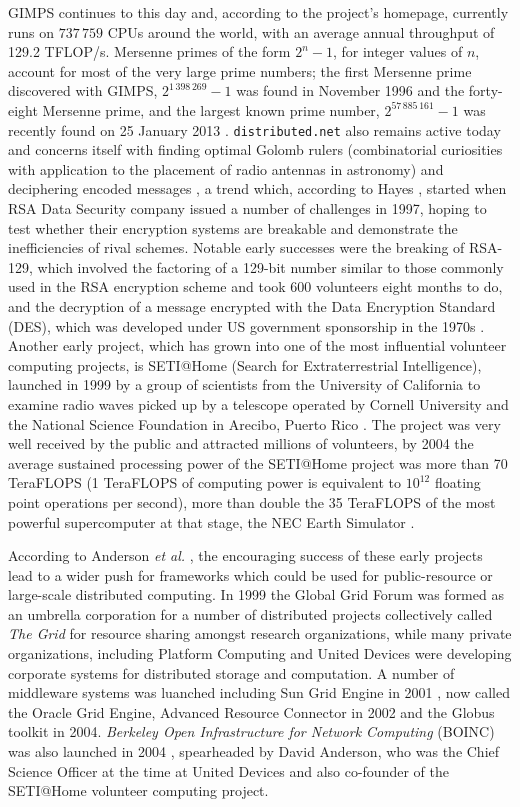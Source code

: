 GIMPS continues to this day and, according to the project's homepage, currently runs on $737\,759$ CPUs around the world, with an average annual throughput of 129.2 TFLOP/s. Mersenne primes of the form $2^n-1$, for integer  values of $n$, account for most of the very large prime numbers; the first Mersenne prime discovered with GIMPS, $2^{1\,398\,269}-1$ was found in November 1996 \cite{hayes} and the  forty-eight Mersenne prime, and the largest known prime number, $2^{57\,885\,161} -1$ was recently found on 25 January 2013 \cite{gimps}. \texttt{distributed.net} also remains active today and concerns itself with finding optimal Golomb rulers (combinatorial curiosities with application to the placement of radio antennas in astronomy) and deciphering encoded messages \cite{distnet}, a trend which, according to Hayes \cite{hayes}, started when RSA Data Security company issued a number of challenges in 1997, hoping to test whether their encryption systems are breakable and demonstrate the inefficiencies of rival schemes. Notable early successes were the breaking of RSA-129, which involved the factoring of a 129-bit number similar to those commonly used in the RSA encryption scheme and  took 600 volunteers eight months to do, and the decryption of a message encrypted with the Data Encryption Standard (DES), which was developed under US government sponsorship in the 1970s \cite{distnet}. 
Another early project, which has grown into one of the most influential volunteer computing projects, is   SETI@Home (Search for Extraterrestrial Intelligence), launched  in 1999 by a group of scientists from the University of California to examine radio waves picked up by a telescope operated by Cornell University and the National Science Foundation in Arecibo, Puerto Rico \cite{anderson:seti2002}. The project was very well received by the public and attracted millions of volunteers, by 2004 the average sustained processing power of the SETI@Home project was more than 70 TeraFLOPS (1 TeraFLOPS of computing power is equivalent to $10^{12}$ floating point operations per second), more than double the 35 TeraFLOPS of the most powerful supercomputer at that stage, the NEC Earth Simulator \cite{anderson2004boinc}.
 
According to Anderson \emph{et al.} \cite{anderson:seti2002}, the encouraging success of these early projects lead to a wider push for frameworks which could be used for public-resource or large-scale distributed computing. In 1999 the Global Grid Forum was formed as an umbrella corporation for a number of distributed projects collectively called \emph{The Grid} \cite{fostergrid} for resource sharing amongst research organizations, while many private organizations, including Platform Computing and United Devices were developing corporate systems for distributed storage and computation. A number of middleware systems was luanched including Sun Grid Engine in 2001 \cite{oracle}, now called the Oracle Grid Engine,  Advanced Resource Connector in 2002 \cite{arc} and the Globus toolkit in 2004.   \emph{Berkeley Open Infrastructure for Network Computing} (BOINC) was also launched in 2004 \cite{anderson2004boinc}, spearheaded by David Anderson, who was the Chief Science Officer at the time at United Devices and also co-founder of the SETI@Home volunteer computing project. 

